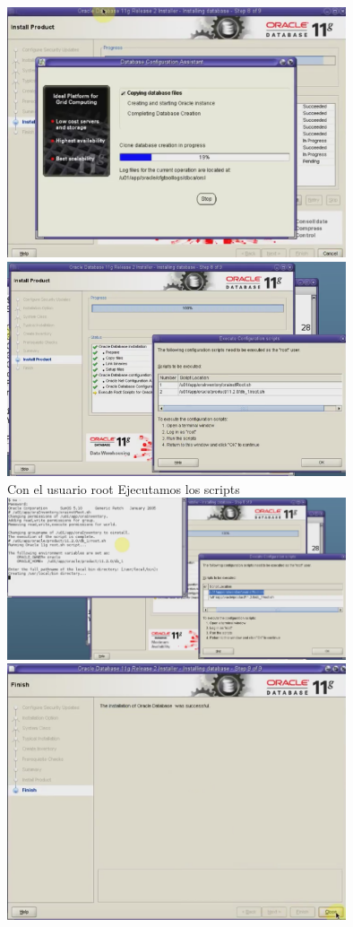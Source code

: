 \documentclass[a4paper,openright,12pt]{book}
\begin{document}
\begin{center}
\includegraphics[width=10cm]{./solari/19.png}\\
\includegraphics[width=10cm]{./solari/20.png}\\
Con el usuario root Ejecutamos los scripts
\includegraphics[width=10cm]{./solari/21.png}\\
\includegraphics[width=10cm]{./solari/22.png}\\


\end{center}
\end{document}
